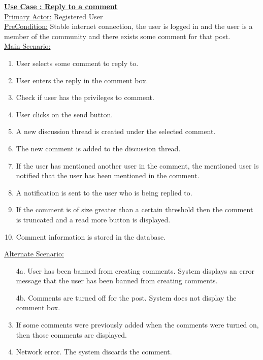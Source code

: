 \documentclass[conference,compsoc]{IEEEtran}
\newcounter{UC}
\newcommand{\nextU}{\stepcounter{UC}\theUC}
\begin{document}
\underline{\textbf{Use Case \nextU: Reply to a comment}}\\

\underline{Primary Actor:} Registered User\\

\underline{PreCondition:} Stable internet connection, the user is logged in and the user is a member of the community and there exists some comment for that post.\\

\underline{Main Scenario:}\\
\begin{enumerate}
    \item User selects some comment to reply to.
    \item User enters the reply in the comment box.
    \item Check if user has the privileges to comment.
    \item User clicks on the send button.
    \item A new discussion thread is created under the selected comment.
    \item The new comment is added to the discussion thread.
    \item If the user has mentioned another user in the comment, the mentioned user is notified that the user has been mentioned in the comment.
    \item A notification is sent to the user who is being replied to.
    \item If the comment is of size greater than a certain threshold then the comment is truncated and a read more button is displayed.
    \item Comment information is stored in the database.
\end{enumerate}

\underline{Alternate Scenario:}\\
\begin{enumerate}
    \item [4a.] User has been banned from creating comments. System displays an error message that the user has been banned from creating comments.
    \item [4b.] Comments are turned off for the post. System does not display the comment box.
    \item If some comments were previously added when the comments were turned on, then those comments are displayed.
    \item Network error. The system discards the comment.
\end{enumerate}\vspace{0.2cm}
\end{document}
